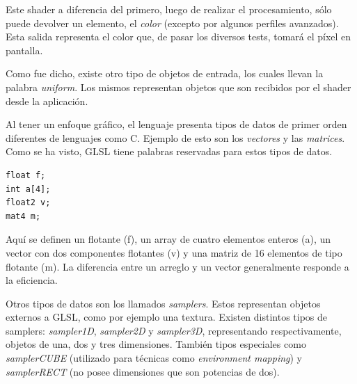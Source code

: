 
Este shader a diferencia del primero, luego de realizar el procesamiento, s\'olo puede devolver un elemento, el {\em color} (excepto por algunos perfiles avanzados). Esta salida representa el color que, de pasar los diversos tests, tomar\'a el p\'ixel en pantalla.

Como fue dicho, existe otro tipo de objetos de entrada, los cuales llevan la palabra {\em uniform}. Los mismos representan objetos que son recibidos por el shader desde la aplicaci\'on.


Al tener un enfoque gr\'afico, el lenguaje presenta tipos de datos de primer orden diferentes de lenguajes como C. Ejemplo de esto son los {\em vectores} y las {\em matrices}. Como se ha visto, GLSL tiene palabras reservadas para estos tipos de datos.
\begin{verbatim}
float f;
int a[4];
float2 v;
mat4 m;
\end{verbatim}
Aqu\'i se definen un flotante (f), un array de cuatro elementos enteros (a), un vector con dos componentes flotantes (v) y una matriz de 16 elementos de tipo flotante (m).
La diferencia entre un arreglo y un vector generalmente responde a la eficiencia.

Otros tipos de datos son los llamados {\em samplers}. Estos representan objetos externos a GLSL, como por ejemplo una textura.
Existen distintos tipos de samplers: {\em sampler1D}, {\em sampler2D} y {\em sampler3D}, representando respectivamente, objetos de una, dos y tres dimensiones. Tambi\'en tipos especiales como {\em samplerCUBE} (utilizado para t\'ecnicas como {\em environment mapping}) y {\em samplerRECT} (no posee dimensiones que son potencias de dos).

